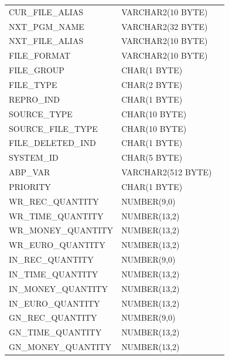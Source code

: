 \documentclass[12pt,twoside]{article}
\begin{document}
\begin{longtable}{lll}
 CUR\_FILE\_ALIAS              &  VARCHAR2(10 BYTE)   &               \\
 NXT\_PGM\_NAME                &  VARCHAR2(32 BYTE)   &               \\
 NXT\_FILE\_ALIAS              &  VARCHAR2(10 BYTE)   &               \\
 FILE\_FORMAT                  &  VARCHAR2(10 BYTE)   &               \\
 FILE\_GROUP                   &  CHAR(1 BYTE)        &               \\
 FILE\_TYPE                    &  CHAR(2 BYTE)        &               \\
 REPRO\_IND                    &  CHAR(1 BYTE)        &               \\
 SOURCE\_TYPE                  &  CHAR(10 BYTE)       &               \\
 SOURCE\_FILE\_TYPE            &  CHAR(10 BYTE)       &               \\
 FILE\_DELETED\_IND            &  CHAR(1 BYTE)        &               \\
 SYSTEM\_ID                    &  CHAR(5 BYTE)        &               \\
 ABP\_VAR                      &  VARCHAR2(512 BYTE)  &               \\
 PRIORITY                      &  CHAR(1 BYTE)        &               \\
 WR\_REC\_QUANTITY             &  NUMBER(9,0)         &               \\
 WR\_TIME\_QUANTITY            &  NUMBER(13,2)        &               \\
 WR\_MONEY\_QUANTITY           &  NUMBER(13,2)        &               \\
 WR\_EURO\_QUANTITY            &  NUMBER(13,2)        &               \\
 IN\_REC\_QUANTITY             &  NUMBER(9,0)         &               \\
 IN\_TIME\_QUANTITY            &  NUMBER(13,2)        &               \\
 IN\_MONEY\_QUANTITY           &  NUMBER(13,2)        &               \\
 IN\_EURO\_QUANTITY            &  NUMBER(13,2)        &               \\
 GN\_REC\_QUANTITY             &  NUMBER(9,0)         &               \\
 GN\_TIME\_QUANTITY            &  NUMBER(13,2)        &               \\
 GN\_MONEY\_QUANTITY           &  NUMBER(13,2)        &               \\

\end{longtable}
\end{document}
